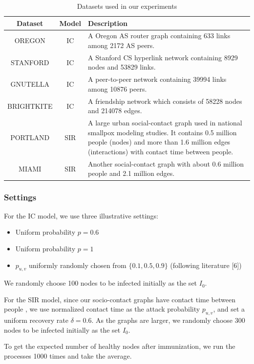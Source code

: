 \documentclass{article}
\begin{document}
\begin{table}[h!]
    \centering
    \begin{tabular}{|c|c|l|}
        \hline
        Dataset & Model & Description \\
        \hline
        OREGON & IC & A Oregon AS router graph containing 633 links among 2172 AS peers. \\
        STANFORD & IC & A Stanford CS hyperlink network containing 8929 nodes and 53829 links. \\
        GNUTELLA & IC & A peer-to-peer network containing 39994 links among 10876 peers. \\
        BRIGHTKITE & IC & A friendship network which consists of 58228 nodes and 214078 edges. \\
        PORTLAND & SIR & A large urban social-contact graph used in national smallpox modeling studies. It contains 0.5 million people (nodes) and more than 1.6 million edges (interactions) with contact time between people. \\
        MIAMI & SIR & Another social-contact graph with about 0.6 million people and 2.1 million edges. \\
        \hline
    \end{tabular}
    \caption{Datasets used in our experiments}
    \label{table:datasets}
\end{table}

\subsubsection{Settings}

For the IC model, we use three illustrative settings: 
\begin{itemize}
    \item Uniform probability $p = 0.6$
    \item Uniform probability $p = 1$
    \item $p_{u,v}$ uniformly randomly chosen from $\{0.1, 0.5, 0.9\}$ (following literature [6])
\end{itemize}
We randomly choose 100 nodes to be infected initially as the set $I_0$.

For the SIR model, since our socio-contact graphs have contact time between people \cite{ref1}, we use normalized contact time as the attack probability $p_{u,v}$, and set a uniform recovery rate $\delta = 0.6$. As the graphs are larger, we randomly choose 300 nodes to be infected initially as the set $I_0$.

To get the expected number of healthy nodes after immunization, we run the processes 1000 times and take the average.
\end{document}
